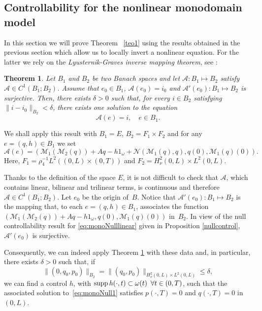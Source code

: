 \documentclass[10pt]{article}
\newtheorem{thm}{Theorem}
\def\om{\omega}
\begin{document}

 \subsection{Controllability for the nonlinear monodomain model}\label{Section:monodomainnonlinear}

	{ In this section we will prove Theorem ~\ref{teo1} using the results obtained
	in the previous section which allow us to locally invert a nonlinear equation.
	For the latter we rely on the {\it Lyusternik-Graves inverse mapping theorem}, see \cite[Chapter $2$, p. $107$]{A-T}:}
\begin{thm} \label{inversemaptheo}
	Let $B_1$ and $B_2$ be two Banach spaces and let $ \mathcal{A} : B_1 \mapsto B_2 $ satisfy $ \mathcal{A} \in C^1(B_1;B_2)$.
	Assume that $e_0 \in B_1$, $\mathcal{A}(e_0) = i_0 $ and $\mathcal{A}'(e_0):B_1 \mapsto B_2 $ is surjective. Then,
	there exists $ \delta > 0$ such that, for every $ i \in B_2$ satisfying $\| i - i_0\|_{B_2} < \delta$, there exists one solution
	to the equation
$$
	\mathcal{A} (e) = i, \quad e \in B_1.
$$
\end{thm}
	
	We shall apply this result with $B_1=E$, $B_2=F_1\times F_2$ and for any $e = (q,h) \in B_1$ we set
$$
	\mathcal{A}(e) =(\mathcal{M}_1(\mathcal{M}_2(q)) + Aq - h1_{\omega}+\mathcal{N}(\mathcal{M}_1(q),q), q(0),\mathcal{M}_1(q)(0)).
$$
	Here, $F_1=\rho_4^{-1} L^2((0,L)\times(0,T))$ and $F_2= H^2_\nu(0,L)\times L^2(0,L)$.

	Thanks to the definition of the space $E$, it is not difficult to check that $\mathcal{A}$, which contains linear, bilinear and trilinear terms, is continuous and therefore $\mathcal{A}\in C^1(B_1;B_2)$. Let $e_0$ be the
	origin of~$B$. Notice that $\mathcal{A}'(e_0): B_1 \mapsto B_2$ is the mapping that, to each $e=(q,h)\in B_1$, associates the
	function $(\mathcal{M}_1(\mathcal{M}_2(q)) + Aq - h1_{\omega} , q(0),\mathcal{M}_1(q)(0))$ in~$B_2$. In view of the null controllability result for \eqref{eq:monoNulllinear}
	given in Proposition \ref{nullcontrol},  $\mathcal{A}'(e_0)$ is surjective.

	Consequently, we can indeed apply Theorem \ref{inversemaptheo} with these data and, in particular, there exists
	$\delta >0$ such that, if
\[
	\|(0,q_0,p_0)\|_{B_2}=\|(q_0,p_0)\|_{H^2_\nu(0,L)\times L^2(0,L)} \leq \delta,
\]
	we can find a control $h$, with $\textnormal{supp}\,h(\cdot,t)\subset\om(t)\,~\forall t\in(0,T)$, such that the associated solution to~\eqref{eq:monoNull1} satisfies $p(\cdot,T) =0$
	and $q(\cdot,T)=0$ in $(0,L)$.
	
\end{document}

